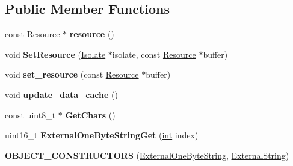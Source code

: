 \subsection*{Public Member Functions}
\begin{DoxyCompactItemize}
\item 
\mbox{\label{classv8_1_1internal_1_1ExternalOneByteString_aa7ab45556afe97f8fb8d017872a4d1f7}} 
const \mbox{\hyperlink{classv8_1_1String_1_1ExternalOneByteStringResource}{Resource}} $\ast$ {\bfseries resource} ()
\item 
\mbox{\label{classv8_1_1internal_1_1ExternalOneByteString_abd08aa61808ef6db74bda2e65df2cf70}} 
void {\bfseries Set\+Resource} (\mbox{\hyperlink{classv8_1_1internal_1_1Isolate}{Isolate}} $\ast$isolate, const \mbox{\hyperlink{classv8_1_1String_1_1ExternalOneByteStringResource}{Resource}} $\ast$buffer)
\item 
\mbox{\label{classv8_1_1internal_1_1ExternalOneByteString_a3fd1a6197b0ecd8c768c5dcd100a9fcc}} 
void {\bfseries set\+\_\+resource} (const \mbox{\hyperlink{classv8_1_1String_1_1ExternalOneByteStringResource}{Resource}} $\ast$buffer)
\item 
\mbox{\label{classv8_1_1internal_1_1ExternalOneByteString_a4daf879e8b7254221da94dfabe7c48a6}} 
void {\bfseries update\+\_\+data\+\_\+cache} ()
\item 
\mbox{\label{classv8_1_1internal_1_1ExternalOneByteString_a6b3e8e097552d2729b1364da56fbeb7f}} 
const uint8\+\_\+t $\ast$ {\bfseries Get\+Chars} ()
\item 
\mbox{\label{classv8_1_1internal_1_1ExternalOneByteString_acb296167eaa5c365607ec04871fa1f93}} 
uint16\+\_\+t {\bfseries External\+One\+Byte\+String\+Get} (\mbox{\hyperlink{classint}{int}} index)
\item 
\mbox{\label{classv8_1_1internal_1_1ExternalOneByteString_aa59b0b177cff75a000f9f8bb71248f86}} 
{\bfseries O\+B\+J\+E\+C\+T\+\_\+\+C\+O\+N\+S\+T\+R\+U\+C\+T\+O\+RS} (\mbox{\hyperlink{classv8_1_1internal_1_1ExternalOneByteString}{External\+One\+Byte\+String}}, \mbox{\hyperlink{classv8_1_1internal_1_1ExternalString}{External\+String}})
\end{DoxyCompactItemize}
